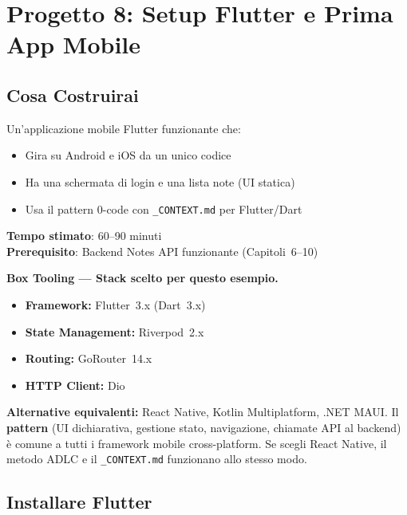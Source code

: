 \chapter{Progetto 8: Setup Flutter e Prima App Mobile}

\section*{Cosa Costruirai}
Un'applicazione mobile Flutter funzionante che:
\begin{itemize}
  \item Gira su Android e iOS da un unico codice
  \item Ha una schermata di login e una lista note (UI statica)
  \item Usa il pattern 0-code con \texttt{\_CONTEXT.md} per Flutter/Dart
\end{itemize}

\textbf{Tempo stimato}: 60--90 minuti\\
\textbf{Prerequisito}: Backend Notes API funzionante (Capitoli~6--10)

\begin{notebox}
\textbf{Box Tooling --- Stack scelto per questo esempio.}
\begin{itemize}
  \item \textbf{Framework:} Flutter~3.x (Dart~3.x)
  \item \textbf{State Management:} Riverpod~2.x
  \item \textbf{Routing:} GoRouter~14.x
  \item \textbf{HTTP Client:} Dio
\end{itemize}
\textbf{Alternative equivalenti:} React Native, Kotlin Multiplatform, .NET MAUI. Il \textbf{pattern} (UI dichiarativa, gestione stato, navigazione, chiamate API al backend) \`e comune a tutti i framework mobile cross-platform. Se scegli React Native, il metodo ADLC e il \texttt{\_CONTEXT.md} funzionano allo stesso modo.
\end{notebox}

\section{Installare Flutter}

